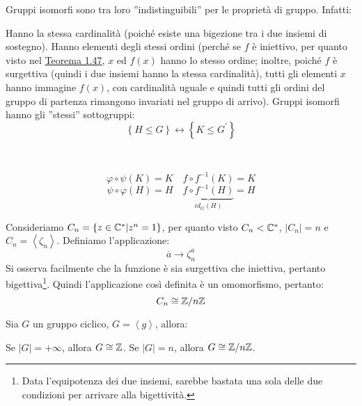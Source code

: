 \documentclass[11pt]{scrartcl}
\begin{document}
\begin{remark}
Gruppi isomorfi sono tra loro ''indistinguibili'' per le proprietà di gruppo. Infatti:
\begin{itemize}
	\ii Hanno la stessa cardinalità (poiché esiste una bigezione tra i due insiemi di sostegno).
	\ii Hanno elementi degli stessi ordini (perché se $f$ è iniettivo, per quanto visto nel \hyperref[thm:g_sei]{Teorema 1.47}, $x$ ed $f(x)$ hanno lo stesso ordine; inoltre, poiché $f$ è surgettiva (quindi i due insiemi hanno la stessa cardinalità), tutti gli elementi $x$ hanno immagine $f(x)$, con cardinalità uguale e quindi tutti gli ordini del gruppo di partenza rimangono invariati nel gruppo di arrivo).
	\ii Gruppi isomorfi hanno gli ''stessi'' sottogruppi:
		\[ \left\{H \leqslant G\right\} \longleftrightarrow \left\{K \leqslant G^{\prime}\right\}
		\]
		\begin{center}
		\\
		\end{center}
		\[
		\varphi \circ \psi (K) = K
		\quad
		f \circ f^{-1} (K) = K
		\]
		\[
		\psi \circ \varphi (H) = H
		\quad
		\underbrace{f \circ f^{-1} (H)}_{id_G (H)} = H
		\]
\end{itemize}
\end{remark}

\begin{example}
Consideriamo $C_{n}=\left \{z \in {\mathbb C}^* | z^n=1 \right \}$, per quanto visto $C_n<\mathbb C^*$, $|C_n|=n$ e $C_n = \left<\zeta_n\right>$. Definiamo l'applicazione:
	\[ \overline{a} \longrightarrow \zeta_n^a
	\]
Si osserva facilmente che la funzione è sia surgettiva che iniettiva, pertanto bigettiva\footnote{Data l'equipotenza dei due insiemi, sarebbe bastata una sola delle due condizioni per arrivare alla bigettività.}. Quindi l'applicazione così definita è un omomorfismo, pertanto:
	\[ C_n \cong {\mathbb Z}/n{\mathbb Z}
	\]
\end{example}
\newpage
\begin{theorem}
\label{g:Iso_ciclici}
Sia $G$ un gruppo ciclico, $G=\left<g\right>$, allora:
	\begin{enumerate}[(1)]
	\ii Se $|G|=+\infty$, allora $G \cong \mathbb Z$.
	\ii Se $|G|=n$, allora $G \cong {\mathbb Z}/n{\mathbb Z}$.
	\end{enumerate}
\end{theorem}
\end{document}
